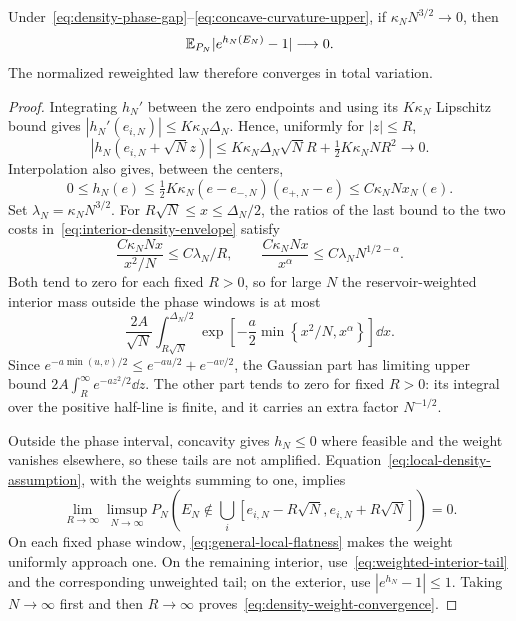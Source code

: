 \begin{proposition}
\label{prop:density-sufficiency}
Under~\eqref{eq:density-phase-gap}--\eqref{eq:concave-curvature-upper},
if $\kappa_NN^{3/2}\to0$, then
\begin{equation}
 \mathbb E_{P_N}|e^{h_N(E_N)}-1|\longrightarrow0.
 \label{eq:density-weight-convergence}
\end{equation}
The normalized reweighted law therefore converges in total variation.
\end{proposition}
\begin{proof}
Integrating $h_N'$ between the zero endpoints and using its
$K\kappa_N$ Lipschitz bound gives $|h_N'(e_{i,N})|\le K\kappa_N\Delta_N$.
Hence, uniformly for $|z|\le R$,
\begin{equation}
 |h_N(e_{i,N}+\sqrt N z)|
 \le K\kappa_N\Delta_N\sqrt N R
       +\tfrac12K\kappa_NNR^2\longrightarrow0.
 \label{eq:general-local-flatness}
\end{equation}
Interpolation also gives, between the centers,
\begin{equation}
 0\le h_N(e)\le\tfrac12K\kappa_N
 (e-e_{-,N})(e_{+,N}-e)
 \le C\kappa_NN x_N(e).
 \label{eq:general-interior-gain}
\end{equation}
Set $\lambda_N=\kappa_NN^{3/2}$. For
$R\sqrt N\le x\le\Delta_N/2$, the ratios of the last bound to the
two costs in~\eqref{eq:interior-density-envelope} satisfy
\[
 \frac{C\kappa_NNx}{x^2/N}\le C\lambda_N/R,
 \qquad
 \frac{C\kappa_NNx}{x^\alpha}
 \le C\lambda_N N^{1/2-\alpha}.
\]
Both tend to zero for each fixed $R>0$, so for large $N$ the
reservoir-weighted interior mass outside the phase windows is at most
\begin{equation}
 \frac{2A}{\sqrt N}\int_{R\sqrt N}^{\Delta_N/2}
 \exp\left[-\frac a2\min\left\{x^2/N,x^\alpha\right\}\right]\dd x.
 \label{eq:weighted-interior-tail}
\end{equation}
Since $e^{-a\min(u,v)/2}\le e^{-au/2}+e^{-av/2}$, the Gaussian part
has limiting upper bound $2A\int_R^\infty e^{-az^2/2}\dd z$. The other
part tends to zero for fixed $R>0$: its integral over the positive
half-line is finite, and it carries an extra factor $N^{-1/2}$.

Outside the phase interval, concavity gives $h_N\le0$ where
feasible and the weight vanishes elsewhere, so these tails are not
amplified. Equation~\eqref{eq:local-density-assumption}, with the
weights summing to one, implies
\[
 \lim_{R\to\infty}\limsup_{N\to\infty}
 P_N\left(E_N\notin\bigcup_i
 [e_{i,N}-R\sqrt N,e_{i,N}+R\sqrt N]\right)=0.
\]
On each fixed phase window,
\eqref{eq:general-local-flatness} makes the weight uniformly approach
one. On the remaining interior, use~\eqref{eq:weighted-interior-tail}
and the corresponding unweighted tail; on the exterior, use
$|e^{h_N}-1|\le1$. Taking $N\to\infty$ first and then $R\to\infty$
proves~\eqref{eq:density-weight-convergence}.
\end{proof}

